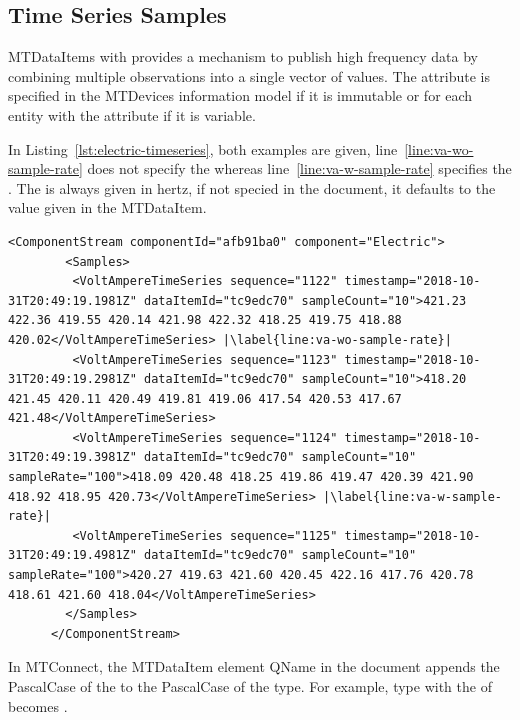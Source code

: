 \subsection{Time Series Samples}

\glspl{MTDataItem} with   provides a mechanism to publish high frequency data by combining multiple observations into a single vector of values. The attribute  is specified in the \glspl{MTDevice} information model if it is immutable or for each entity with the attribute  if it is variable. 

In Listing~\ref{lst:electric-timeseries}, both examples are given, line~\ref{line:va-wo-sample-rate} does not specify the  whereas line~\ref{line:va-w-sample-rate} specifies the . The  is always given in hertz, if not specied in the  document, it defaults to the value given in the \gls{MTDataItem}.

\begin{lstlisting}[firstnumber=last,escapechar=|,%
    caption={Electric Component Time Series Example},label={lst:electric-timeseries}]
      <ComponentStream componentId="afb91ba0" component="Electric">
        <Samples>
         <VoltAmpereTimeSeries sequence="1122" timestamp="2018-10-31T20:49:19.1981Z" dataItemId="tc9edc70" sampleCount="10">421.23 422.36 419.55 420.14 421.98 422.32 418.25 419.75 418.88 420.02</VoltAmpereTimeSeries> |\label{line:va-wo-sample-rate}|
         <VoltAmpereTimeSeries sequence="1123" timestamp="2018-10-31T20:49:19.2981Z" dataItemId="tc9edc70" sampleCount="10">418.20 421.45 420.11 420.49 419.81 419.06 417.54 420.53 417.67 421.48</VoltAmpereTimeSeries>
         <VoltAmpereTimeSeries sequence="1124" timestamp="2018-10-31T20:49:19.3981Z" dataItemId="tc9edc70" sampleCount="10" sampleRate="100">418.09 420.48 418.25 419.86 419.47 420.39 421.90 418.92 418.95 420.73</VoltAmpereTimeSeries> |\label{line:va-w-sample-rate}|
         <VoltAmpereTimeSeries sequence="1125" timestamp="2018-10-31T20:49:19.4981Z" dataItemId="tc9edc70" sampleCount="10" sampleRate="100">420.27 419.63 421.60 420.45 422.16 417.76 420.78 418.61 421.60 418.04</VoltAmpereTimeSeries>
        </Samples>
      </ComponentStream>
\end{lstlisting}

In MTConnect, the \gls{MTDataItem} element \gls{QName} in the  document appends the \gls{PascalCase} of the  to the \gls{PascalCase} of the \gls{type}. For example, \gls{type}  with the  of  becomes . 

